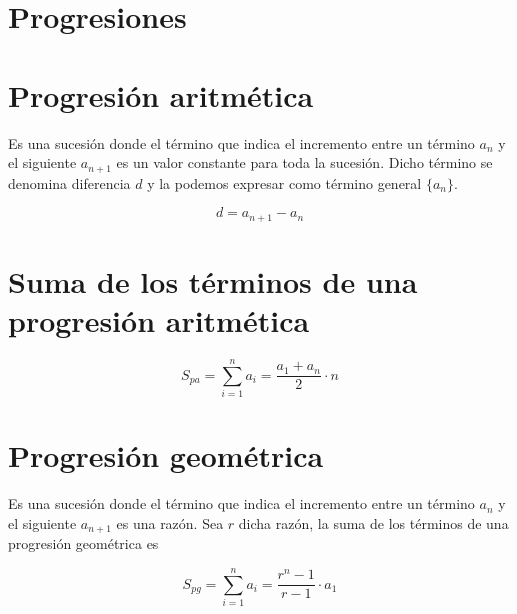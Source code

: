 \section{Progresiones}

\section{Progresión aritmética}
Es una sucesión donde el término que indica el incremento entre un término $a_n$ y el siguiente
$a_{n+1}$ es un valor constante para toda la sucesión. Dicho término se denomina diferencia $d$ y
la podemos expresar como término general $\{a_n\}$.

$$d=a_{n+1}-a_n$$

\section{Suma de los términos de una progresión aritmética}
$$S_{pa}=\sum_{i=1}^n a_i = \frac{a_1+a_n}{2}\cdot n$$

\section{Progresión geométrica}
Es una sucesión donde el término que indica el incremento entre un término $a_n$ y el siguiente
$a_{n+1}$ es una razón. Sea $r$ dicha razón, la suma de los términos de una progresión geométrica es

$$S_{pg}=\sum_{i=1}^na_i=\frac{r^n-1}{ r-1}\cdot a_1$$

\printindex

\nocite{prieto2008}
\printbibliography


